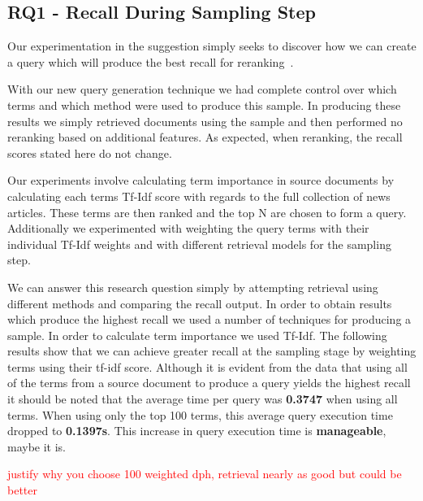 \documentclass{mpaper}
\let\oldcite=\cite
\renewcommand\cite[1]{\ifthenelse{\equal{#1}{NEEDED}}{\ensuremath{^\texttt{[citation~needed]}}}{\oldcite{#1}}}
\newcommand{\remove}[1]{\textcolor{red}{#1}}
\begin{document}
\subsection{RQ1 - Recall During Sampling Step} \label{sec:RQ1}
Our experimentation in the suggestion simply seeks to discover how we can create a query which will produce the best recall for reranking~\cite{NEEDED}.

With our new query generation technique we had complete control over which terms and which method were used to produce this sample.
In producing these results we simply retrieved documents using the sample and then performed no reranking based on additional features. As expected, when reranking, the recall scores stated here do not change.

Our experiments involve calculating term importance in source documents by calculating each terms Tf-Idf score with regards to the full collection of news articles. These terms are then ranked and the top N are chosen to form a query. Additionally we experimented with weighting the query terms with their individual Tf-Idf weights and with different retrieval models for the sampling step.

We can answer this research question simply by attempting retrieval using different methods and comparing the recall output.
In order to obtain results which produce the highest recall we used a number of techniques for producing a sample. 
In order to calculate term importance we used Tf-Idf.
The following results show that we can achieve greater recall at the sampling stage by weighting terms using their tf-idf score.
Although it is evident from the data that using all of the terms from a source document to produce a query yields the highest recall it should be noted that the average time per query was \textbf{0.3747} when using all terms. When using only the top 100 terms, this average query execution time dropped to \textbf{0.1397s}.
This increase in query execution time is \textbf{manageable}, maybe it is.

\remove{justify why you choose 100 weighted dph, retrieval nearly as good but could be better}
\end{document}

